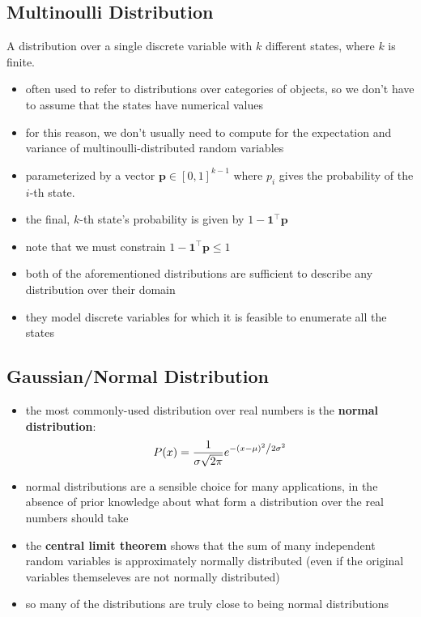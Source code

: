 \documentclass[11pt, twocolumn]{report}
\begin{document}
\subsection{Multinoulli Distribution}
A distribution over a single discrete variable with $k$ different states, where
$k$ is finite.
\begin{itemize}
  \item often used to refer to distributions over categories of objects, so we
    don't have to assume that the states have numerical values
  \item for this reason, we don't usually need to compute for the expectation
    and variance of multinoulli-distributed random variables
  \item parameterized by a vector $\bm{p} \in [0, 1]^{k - 1}$ where $p_i$ gives
    the probability of the $i$-th state.
  \item the final, $k$-th state's probability is given by $1 -
    \bm{1}^\intercal\bm{p}$
  \item note that we must constrain $1 - \bm{1}^\intercal\bm{p} \leq 1$
  \item both of the aforementioned distributions are sufficient to describe any
    distribution over their domain
  \item they model discrete variables for which it is feasible to enumerate all
    the states
\end{itemize}
\subsection{Gaussian/Normal Distribution}
\begin{itemize}
  \item the most commonly-used distribution over real numbers is the
    \textbf{normal distribution}:
    \begin{equation}
      P(x) = \frac{1}{{\sigma \sqrt {2\pi } }}e^{{{ - \left( {x - \mu } \right)^2 }
          \mathord{\left/ {\vphantom {{ - \left( {x - \mu } \right)^2 } {2\sigma ^2
                  }}} \right. \kern-\nulldelimiterspace} {2\sigma ^2 }}}
    \end{equation}
  \item normal distributions are a sensible choice for many applications, in the
    absence of prior knowledge about what form a distribution over the real
    numbers should take
  \item the \textbf{central limit theorem} shows that the sum of many
    independent random variables is approximately normally distributed (even if
    the original variables themseleves are not normally distributed)
  \item so many of the distributions are truly close to being normal
    distributions
\end{itemize}
\end{document}
